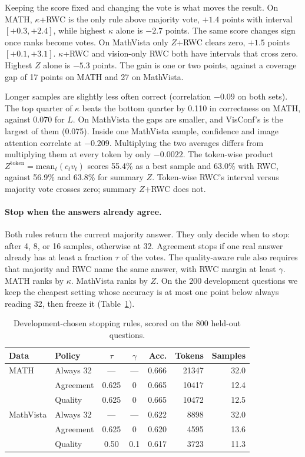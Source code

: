 \documentclass[10pt]{article}
\begin{document}
Keeping the score fixed and changing the vote is what moves the result.
On MATH, $\kappa$+RWC is the only rule above majority vote, $+1.4$ points with interval $[+0.3,+2.4]$, while highest $\kappa$ alone is $-2.7$ points.
The same score changes sign once ranks become votes.
On MathVista only $Z$+RWC clears zero, $+1.5$ points $[+0.1,+3.1]$.
$\kappa$+RWC and vision-only RWC both have intervals that cross zero.
Highest $Z$ alone is $-5.3$ points.
The gain is one or two points, against a coverage gap of 17 points on MATH and 27 on MathVista.

Longer samples are slightly less often correct (correlation $-0.09$ on both sets).
The top quarter of $\kappa$ beats the bottom quarter by 0.110 in correctness on MATH, against 0.070 for $L$.
On MathVista the gaps are smaller, and VisConf's is the largest of them (0.075).
Inside one MathVista sample, confidence and image attention correlate at $-0.209$.
Multiplying the two averages differs from multiplying them at every token by only $-0.0022$.
The token-wise product $Z^{\mathrm{token}}=\mathrm{mean}_t(c_t v_t)$ scores 55.4\% as a best sample and 63.0\% with RWC, against 56.9\% and 63.8\% for summary $Z$.
Token-wise RWC's interval versus majority vote crosses zero; summary $Z$+RWC does not.

\paragraph{Stop when the answers already agree.}
Both rules return the current majority answer.
They only decide when to stop: after 4, 8, or 16 samples, otherwise at 32.
Agreement stops if one real answer already has at least a fraction $\tau$ of the votes.
The quality-aware rule also requires that majority and RWC name the same answer, with RWC margin at least $\gamma$.
MATH ranks by $\kappa$.
MathVista ranks by $Z$.
On the 200 development questions we keep the cheapest setting whose accuracy is at most one point below always reading 32, then freeze it (Table~\ref{tab:adapt}).

\begin{table}[t]
\centering
\caption{Development-chosen stopping rules, scored on the 800 held-out questions.}
\label{tab:adapt}
\scriptsize
\setlength{\tabcolsep}{2.4pt}
\begin{tabular}{llccrrr}
\toprule
Data & Policy & $\tau$ & $\gamma$ & Acc. & Tokens & Samples \\
\midrule
MATH & Always 32 & --- & --- & 0.666 & 21347 & 32.0 \\
 & Agreement & 0.625 & 0 & 0.665 & 10417 & 12.4 \\
 & Quality & 0.625 & 0 & 0.665 & 10472 & 12.5 \\
MathVista & Always 32 & --- & --- & 0.622 & 8898 & 32.0 \\
 & Agreement & 0.625 & 0 & 0.620 & 4595 & 13.6 \\
 & Quality & 0.50 & 0.1 & 0.617 & 3723 & 11.3 \\
\bottomrule
\end{tabular}
\end{table}
\end{document}
